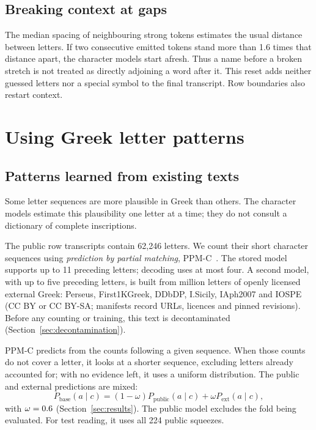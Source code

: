 \documentclass[11pt]{article}
\begin{document}
\subsection{Breaking context at gaps}
The median spacing of neighbouring strong tokens estimates the usual distance between letters.
If two consecutive emitted tokens stand more than 1.6 times that distance apart, the character models
start afresh. Thus a name before a broken stretch is not treated as directly adjoining a word after it.
This reset adds neither guessed letters nor a special symbol to the final transcript.
Row boundaries also restart context.

\section{Using Greek letter patterns}
\label{sec:lm}
\subsection{Patterns learned from existing texts}
Some letter sequences are more plausible in Greek than others. The character models estimate this
plausibility one letter at a time; they do not consult a dictionary of complete inscriptions.

The public row transcripts contain 62,246 letters. We count their short character sequences using
\emph{prediction by partial matching}, PPM-C~\cite{cleary1984,moffat1990}. The stored model supports
up to 11 preceding letters; decoding uses at most four. A second model, with up to five preceding letters,
is built from \ExtLetters{} million letters of openly licensed external Greek: Perseus, First1KGreek,
DDbDP, I.Sicily, IAph2007 and IOSPE (CC BY or CC BY-SA; manifests record URLs, licences and pinned
revisions). Before any counting or training, this text is decontaminated
(Section~\ref{sec:decontamination}).

PPM-C predicts from the counts following a given sequence. When those counts do not cover a letter,
it looks at a shorter sequence, excluding letters already accounted for; with no evidence left, it
uses a uniform distribution. The public and external predictions are mixed:
\begin{equation}
 P_{\mathrm{base}}(a\mid c)=(1-\omega)P_{\mathrm{public}}(a\mid c)+\omega P_{\mathrm{ext}}(a\mid c),
 \label{eq:base}
\end{equation}
with $\omega=0.6{}$ (Section~\ref{sec:results}). The public model excludes the fold being
evaluated. For test reading, it uses all 224 public squeezes.
\end{document}
